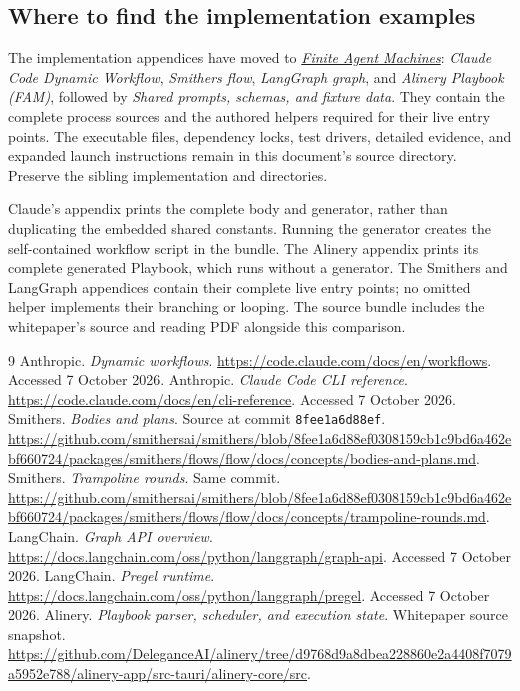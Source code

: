 \documentclass[11pt,letterpaper]{article}
\newcommand{\file}[1]{\texttt{\detokenize{#1}}}
\begin{document}
\subsection{Where to find the implementation examples}
The implementation appendices have moved to
\href{../playbook-execution-model/v3/playbook-execution-model.pdf}{\emph{Finite Agent Machines}}:
\emph{Claude Code Dynamic Workflow}, \emph{Smithers flow}, \emph{LangGraph graph},
and \emph{Alinery Playbook (FAM)}, followed by
\emph{Shared prompts, schemas, and fixture data}. They contain the complete
process sources and the authored helpers required for their live entry points.
The executable files, dependency locks, test drivers, detailed evidence, and
expanded launch instructions remain in this document's source directory.
Preserve the sibling implementation and \file{shared/} directories.

Claude's appendix prints the complete body and generator, rather than
duplicating the embedded shared constants. Running the generator creates the
self-contained workflow script in the bundle. The Alinery appendix prints its
complete generated Playbook, which runs without a generator. The Smithers and
LangGraph appendices contain their complete live entry points; no omitted
helper implements their branching or looping. The source bundle includes the
whitepaper's source and reading PDF alongside this comparison.

\begin{thebibliography}{9}
 Anthropic. \emph{Dynamic workflows}. \url{https://code.claude.com/docs/en/workflows}. Accessed 7 October 2026.
 Anthropic. \emph{Claude Code CLI reference}. \url{https://code.claude.com/docs/en/cli-reference}. Accessed 7 October 2026.
 Smithers. \emph{Bodies and plans}. Source at commit \texttt{8fee1a6d88ef}. \url{https://github.com/smithersai/smithers/blob/8fee1a6d88ef0308159cb1c9bd6a462ebf660724/packages/smithers/flows/flow/docs/concepts/bodies-and-plans.md}.
 Smithers. \emph{Trampoline rounds}. Same commit. \url{https://github.com/smithersai/smithers/blob/8fee1a6d88ef0308159cb1c9bd6a462ebf660724/packages/smithers/flows/flow/docs/concepts/trampoline-rounds.md}.
 LangChain. \emph{Graph API overview}. \url{https://docs.langchain.com/oss/python/langgraph/graph-api}. Accessed 7 October 2026.
 LangChain. \emph{Pregel runtime}. \url{https://docs.langchain.com/oss/python/langgraph/pregel}. Accessed 7 October 2026.
 Alinery. \emph{Playbook parser, scheduler, and execution state}. Whitepaper source snapshot. \url{https://github.com/DeleganceAI/alinery/tree/d9768d9a8dbea228860e2a4408f7079a5952e788/alinery-app/src-tauri/alinery-core/src}.
\end{thebibliography}
\end{document}
